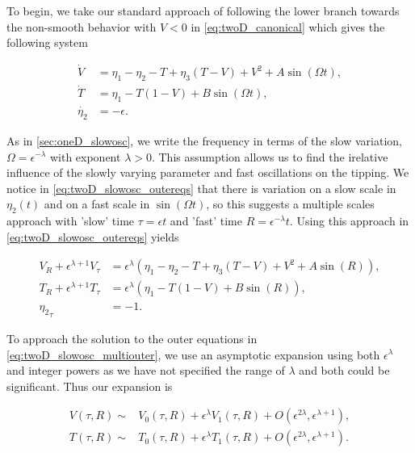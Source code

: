 To begin, we take our standard approach of following the lower branch towards the non-smooth behavior with $V<0$ in \eqref{eq:twoD_canonical} which gives the following system  

\begin{equation}\label{eq:twoD_slowosc_outereqs}
 \begin{aligned}
   \dot{V} & =  \eta_1-\eta_2-T+\eta_3(T-V)+V^2+A\sin(\Omega t), \\
   \dot{T} & =  \eta_1-T(1-V)+B\sin(\Omega t),  \\
  \dot{\eta_2}  & =  -\epsilon.
  \end{aligned}
\end{equation}

As in \autoref{sec:oneD_slowosc}, we write the frequency in terms of the slow variation, $\Omega = \epsilon^{-\lambda}$ with exponent $\lambda>0$. This assumption allows us to find the irelative influence of the slowly varying parameter and fast oscillations on the tipping. We notice in \eqref{eq:twoD_slowosc_outereqs} that there is variation on a slow scale in $\eta_2(t)$ and on a fast scale in $\sin(\Omega t)$, so this suggests a multiple scales approach with 'slow' time $\tau = \epsilon t$ and 'fast' time $R=\epsilon^{-\lambda}t$. Using this approach in \eqref{eq:twoD_slowosc_outereqs} yields

\begin{equation}\label{eq:twoD_slowosc_multiouter}
 \begin{aligned}
V_R+\epsilon^{\lambda+1}V_\tau & = \epsilon^{\lambda} \left(\eta_1-\eta_2-		T+\eta_3(T-V)+V^2+A\sin(R)\right), \\
T_R+\epsilon^{\lambda+1}T_\tau & = \epsilon^{\lambda}\left( \eta_1-T(1-		  V)+B\sin(R)\right),  \\
	{\eta_2}_\tau  & =  -1.
\end{aligned}
\end{equation}
  
To approach the solution to the outer equations in \eqref{eq:twoD_slowosc_multiouter}, we use an asymptotic expansion using both $\epsilon^\lambda$ and integer powers as we have not specified the range of $\lambda$ and both could be significant. Thus our expansion is

\begin{equation}\label{eq:twoD_slowosc_outerexpansion}
	\begin{aligned}
		V(\tau,R)\sim& V_0(\tau,R)+\epsilon^\lambda 	V_1(\tau,R)+O(\epsilon^{2\lambda},\epsilon^{\lambda+1}),\\
        T(\tau,R)\sim& T_0(\tau,R)+\epsilon^\lambda T_1(\tau,R)+O(\epsilon^{2\lambda},\epsilon^{\lambda+1}).
	\end{aligned}
\end{equation}

